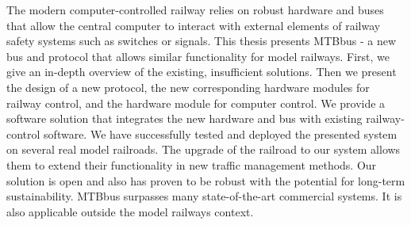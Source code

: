 The modern computer-controlled railway relies on robust hardware and
buses that allow the central computer to interact with external elements of
railway safety systems such as switches or signals. This thesis presents MTBbus
- a new bus and protocol that allows similar functionality for model railways.
First, we give an in-depth overview of the existing, insufficient solutions.
Then we present the design of a new protocol, the new corresponding hardware
modules for railway control, and the hardware module for computer control. We
provide a software solution that integrates the new hardware and bus with
existing railway-control software. We have successfully tested and deployed
the presented system on several real model railroads. The upgrade of the
railroad to our system allows them to extend their functionality in new traffic
management methods. Our solution is open and also has proven to be robust with
the potential for long-term sustainability. MTBbus surpasses many
state-of-the-art commercial systems. It is also applicable outside the model
railways context.
